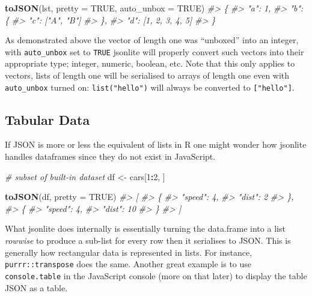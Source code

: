 \documentclass[
]{krantz}
\makeatletter
\newenvironment{Shaded}{\begin{snugshade}}{\end{snugshade}}
\newcommand{\CommentTok}[1]{\textcolor[rgb]{0.37,0.37,0.37}{\textit{#1}}}
\newcommand{\DataTypeTok}[1]{\textcolor[rgb]{0.27,0.27,0.27}{#1}}
\newcommand{\DecValTok}[1]{\textcolor[rgb]{0.06,0.06,0.06}{#1}}
\newcommand{\KeywordTok}[1]{\textcolor[rgb]{0.27,0.27,0.27}{\textbf{#1}}}
\newcommand{\NormalTok}[1]{#1}
\newcommand{\OperatorTok}[1]{\textcolor[rgb]{0.43,0.43,0.43}{\textbf{#1}}}
\newcommand{\OtherTok}[1]{\textcolor[rgb]{0.37,0.37,0.37}{#1}}
\newcommand{\StringTok}[1]{\textcolor[rgb]{0.5,0.5,0.5}{#1}}
\newenvironment{kframe}{%
\medskip{}
\setlength{\fboxsep}{.8em}
 \def\at@end@of@kframe{}%
 \ifinner\ifhmode%
  \def\at@end@of@kframe{\end{minipage}}%
  \begin{minipage}{\columnwidth}%
 \fi\fi%
 \def\FrameCommand##1{\hskip\@totalleftmargin \hskip-\fboxsep
 \colorbox{shadecolor}{##1}\hskip-\fboxsep
     \hskip-\linewidth \hskip-\@totalleftmargin \hskip\columnwidth}%
 \MakeFramed {\advance\hsize-\width
   \@totalleftmargin\z@ \linewidth\hsize
   \@setminipage}}%
 {\par\unskip\endMakeFramed%
 \at@end@of@kframe}
\renewenvironment{Shaded}{\begin{kframe}}{\end{kframe}}
\makeatother
\begin{document}
\begin{Shaded}
\begin{Highlighting}[]
\KeywordTok{toJSON}\NormalTok{(lst, }\DataTypeTok{pretty =} \OtherTok{TRUE}\NormalTok{, }\DataTypeTok{auto\_unbox =} \OtherTok{TRUE}\NormalTok{)}
\CommentTok{\#> \{}
\CommentTok{\#>   "a": 1,}
\CommentTok{\#>   "b": \{}
\CommentTok{\#>     "c": ["A", "B"]}
\CommentTok{\#>   \},}
\CommentTok{\#>   "d": [1, 2, 3, 4, 5]}
\CommentTok{\#> \}}
\end{Highlighting}
\end{Shaded}

As demonstrated above the vector of length one was ``unboxed'' into an integer, with \texttt{auto\_unbox} set to \texttt{TRUE} jsonlite will properly convert such vectors into their appropriate type; integer, numeric, boolean, etc. Note that this only applies to vectors, lists of length one will be serialised to arrays of length one even with \texttt{auto\_unbox} turned on: \texttt{list("hello")} will always be converted to \texttt{{[}"hello"{]}}.

\hypertarget{basics-tabular}{%
\subsection{Tabular Data}\label{basics-tabular}}

If JSON is more or less the equivalent of lists in R one might wonder how jsonlite handles dataframes since they do not exist in JavaScript.

\begin{Shaded}
\begin{Highlighting}[]
\CommentTok{\# subset of built{-}in dataset}
\NormalTok{df <{-}}\StringTok{ }\NormalTok{cars[}\DecValTok{1}\OperatorTok{:}\DecValTok{2}\NormalTok{, ]}

\KeywordTok{toJSON}\NormalTok{(df, }\DataTypeTok{pretty =} \OtherTok{TRUE}\NormalTok{)}
\CommentTok{\#> [}
\CommentTok{\#>   \{}
\CommentTok{\#>     "speed": 4,}
\CommentTok{\#>     "dist": 2}
\CommentTok{\#>   \},}
\CommentTok{\#>   \{}
\CommentTok{\#>     "speed": 4,}
\CommentTok{\#>     "dist": 10}
\CommentTok{\#>   \}}
\CommentTok{\#> ]}
\end{Highlighting}
\end{Shaded}

What jsonlite does internally is essentially turning the data.frame into a list \emph{rowwise} to produce a sub-list for every row then it serialises to JSON. This is generally how rectangular data is represented in lists. For instance, \texttt{purrr::transpose} does the same. Another great example is to use \texttt{console.table} in the JavaScript console (more on that later) to display the table JSON as a table.
\end{document}
